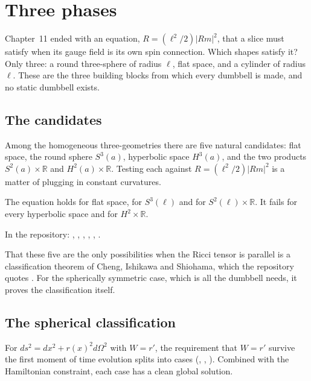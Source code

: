 \chapter{Three phases}\label{ch:phases}

\begin{questionbox}
Chapter~11 ended with an equation, $R=(\ell^2/2)|Rm|^2$, that a slice must satisfy when its gauge field is its own spin connection. Which shapes satisfy it? Only three: a round three-sphere of radius $\ell$, flat space, and a cylinder of radius $\ell$. These are the three building blocks from which every dumbbell is made, and no static dumbbell exists.
\end{questionbox}

\section{The candidates}

Among the homogeneous three-geometries there are five natural candidates: flat space, the round sphere $S^3(a)$, hyperbolic space $H^3(a)$, and the two products $S^2(a)\times\mathbb R$ and $H^2(a)\times\mathbb R$. Testing each against $R=(\ell^2/2)|Rm|^2$ is a matter of plugging in constant curvatures.

\begin{proposition}\proved
The equation holds for flat space, for $S^3(\ell)$ and for $S^2(\ell)\times\mathbb R$. It fails for every hyperbolic space and for $H^2\times\mathbb R$.
\end{proposition}
\noindent In the repository: , , , , , .

That these five are the only possibilities when the Ricci tensor is parallel is a classification theorem of Cheng, Ishikawa and Shiohama, which the repository quotes \external. For the spherically symmetric case, which is all the dumbbell needs, it proves the classification itself.

\section{The spherical classification}

For $ds^2=dx^2+r(x)^2d\Omega^2$ with $W=r'$, the requirement that $W=r'$ survive the first moment of time evolution splits into cases (, , ). Combined with the Hamiltonian constraint, each case has a clean global solution.

